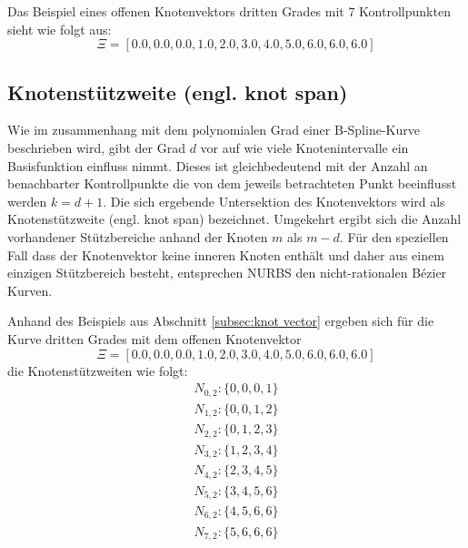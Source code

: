 \documentclass[german,a4paper,12pt,oneside]{scrbook}
\theoremstyle{definition}
\theoremstyle{definition}
\theoremstyle{definition}
\theoremstyle{definition}
\theoremstyle{definition}
\theoremstyle{definition}
\begin{document}
Das Beispiel eines offenen Knotenvektors dritten Grades mit 7 Kontrollpunkten sieht wie folgt aus:
\begin{equation*}
    \Xi = [0.0, 0.0, 0.0, 1.0, 2.0, 3.0, 4.0, 5.0, 6.0, 6.0, 6.0]
\end{equation*}

\subsection{Knotenstützweite (engl. knot span)}
\label{subsec: Knotenstuetzweite}
Wie im zusammenhang mit dem polynomialen Grad einer B-Spline-Kurve beschrieben wird, gibt der Grad $d$ vor auf wie viele Knotenintervalle ein Basisfunktion einfluss nimmt. Dieses ist gleichbedeutend mit der Anzahl an benachbarter Kontrollpunkte die von dem jeweils betrachteten Punkt beeinflusst werden $k = d + 1$. Die sich ergebende Untersektion des Knotenvektors wird als Knotenstützweite (engl. knot span) bezeichnet. Umgekehrt ergibt sich die Anzahl vorhandener Stützbereiche anhand der Knoten $m$ als $m - d$. Für den speziellen Fall dass der Knotenvektor keine inneren Knoten enthält und daher aus einem einzigen Stützbereich besteht, entsprechen NURBS den nicht-rationalen Bézier Kurven. 

Anhand des Beispiels aus Abschnitt \ref{subsec:knot vector} ergeben sich für die Kurve dritten Grades mit dem offenen Knotenvektor 
\begin{equation*}
    \Xi = [0.0, 0.0, 0.0, 1.0, 2.0, 3.0, 4.0, 5.0, 6.0, 6.0, 6.0]
\end{equation*}
die Knotenstützweiten wie folgt:
\begin{equation*}
\begin{split}
    N_{0,2} : \{0,0,0,1\} \\
    N_{1,2} : \{0,0,1,2\} \\
    N_{2,2} : \{0,1,2,3\} \\
    N_{3,2} : \{1,2,3,4\} \\
    N_{4,2} : \{2,3,4,5\} \\
    N_{5,2} : \{3,4,5,6\} \\
    N_{6,2} : \{4,5,6,6\} \\
    N_{7,2} : \{5,6,6,6\} \\   
\end{split}
\end{equation*}

\end{document}
